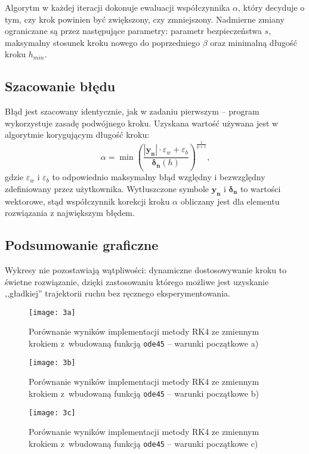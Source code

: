 \documentclass[12pt]{article}
\begin{document}
Algorytm w każdej iteracji dokonuje ewaluacji współczynnika \( \alpha \), który decyduje o tym, czy krok powinien być zwiększony, czy zmniejszony. Nadmierne zmiany ograniczane są przez następujące parametry: parametr bezpieczeństwa \( s \), maksymalny stosunek kroku nowego do poprzedniego \( \beta \) oraz minimalną długość kroku \( h_{min} \).

\subsection{Szacowanie błędu}
Błąd jest szacowany identycznie, jak w zadaniu pierwszym -- program wykorzystuje zasadę podwójnego kroku. Uzyskana wartość używana jest w algorytmie korygującym długość kroku:
\[ \alpha = \min (\frac{|\mathbf{y_n}|\cdot \varepsilon_w + \varepsilon_b}{\mathbf{\delta_n}(h)})^{\frac{1}{p+1}} \text{,}\]
gdzie \( \varepsilon_w \) i \( \varepsilon_b \) to odpowiednio maksymalny błąd względny i bezwzględny zdefiniowany przez użytkownika. Wytłuszczone symbole \( \mathbf{y_n} \) i \( \mathbf{\delta_n} \) to wartości wektorowe, stąd współczynnik korekcji kroku \( \alpha \) obliczany jest dla elementu rozwiązania z największym błędem.

\subsection{Podsumowanie graficzne}
Wykresy nie pozostawiają wątpliwości: dynamiczne dostosowywanie kroku to świetne rozwiązanie, dzięki zastosowaniu którego możliwe jest uzyskanie ,,gładkiej'' trajektorii ruchu bez ręcznego eksperymentowania.

\begin{figure}[!htbp]
\centering
\texttt{[image: 3a]}
\centering
\caption{Porównanie wyników implementacji metody RK4 ze zmiennym krokiem z~wbudowaną funkcją \texttt{ode45} -- warunki początkowe a)}
\label{fig:3a}
\end{figure}
\FloatBarrier

\begin{figure}[!htbp]
\centering
\texttt{[image: 3b]}
\centering
\caption{Porównanie wyników implementacji metody RK4 ze zmiennym krokiem z~wbudowaną funkcją \texttt{ode45} -- warunki początkowe b)}
\label{fig:3b}
\end{figure}
\FloatBarrier

\begin{figure}[!htbp]
\centering
\texttt{[image: 3c]}
\centering
\caption{Porównanie wyników implementacji metody RK4 ze zmiennym krokiem z~wbudowaną funkcją \texttt{ode45} -- warunki początkowe c)}
\label{fig:3c}
\end{figure}
\FloatBarrier
\end{document}
